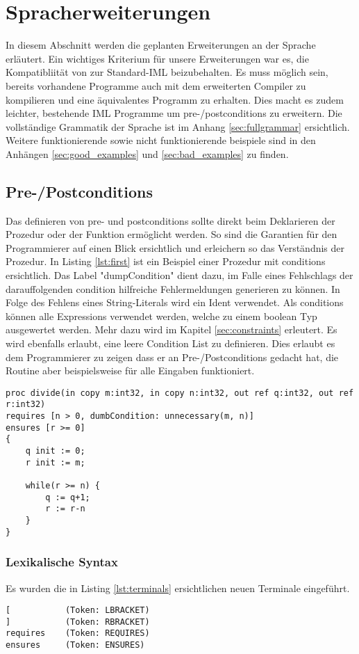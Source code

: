 \section{Spracherweiterungen}
In diesem Abschnitt werden die geplanten Erweiterungen an der Sprache erläutert. 
Ein wichtiges Kriterium für unsere Erweiterungen war es, die Kompatibliität von 
zur Standard-IML beizubehalten. Es muss möglich sein, bereits vorhandene Programme
auch mit dem erweiterten Compiler zu kompilieren und eine äquivalentes Programm zu 
erhalten. Dies macht es zudem leichter, bestehende IML Programme um pre-/postconditions
zu erweitern.
Die vollständige Grammatik der Sprache ist im Anhang \ref{sec:fullgrammar} 
ersichtlich. Weitere funktionierende sowie nicht funktionierende beispiele sind in den Anhängen
\ref{sec:good_examples} und \ref{sec:bad_examples} zu finden.

\subsection{Pre-/Postconditions}
Das definieren von pre- und postconditions sollte direkt beim Deklarieren
der Prozedur oder der Funktion ermöglicht werden. So sind die Garantien
für den Programmierer auf einen Blick ersichtlich und erleichern so 
das Verständnis der Prozedur. In Listing \ref{lst:first} ist ein Beispiel 
einer Prozedur mit conditions ersichtlich. Das Label "dumpCondition" dient dazu, im
Falle eines Fehlschlags der darauffolgenden condition hilfreiche Fehlermeldungen generieren zu können.
In Folge des Fehlens eines String-Literals wird ein Ident verwendet.
Als conditions können alle Expressions verwendet
werden, welche zu einem boolean Typ ausgewertet werden. Mehr dazu wird im 
Kapitel \ref{sec:constraints} erleutert.
Es wird ebenfalls erlaubt, eine leere Condition List zu definieren. Dies erlaubt es dem Programmierer
zu zeigen dass er an Pre-/Postconditions gedacht hat, die Routine aber beispielsweise für alle
Eingaben funktioniert.
\newline
\begin{lstlisting}[caption=Beispiele von pre-/postconditions,label={lst:first}]
proc divide(in copy m:int32, in copy n:int32, out ref q:int32, out ref r:int32)
requires [n > 0, dumbCondition: unnecessary(m, n)]
ensures [r >= 0]
{
    q init := 0;
    r init := m;

    while(r >= n) {
        q := q+1;
        r := r-n
    }
}
\end{lstlisting}

\subsubsection{Lexikalische Syntax}
Es wurden die in Listing \ref{lst:terminals} ersichtlichen neuen Terminale eingeführt.
\begin{lstlisting}[caption=Liste neuer Terminalsymbole,label=lst:terminals]
[           (Token: LBRACKET)
]           (Token: RBRACKET)
requires    (Token: REQUIRES)
ensures     (Token: ENSURES)
\end{lstlisting}

